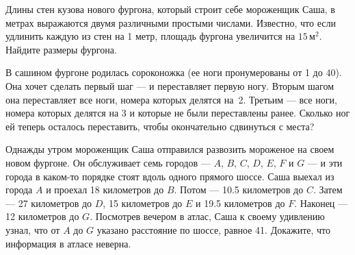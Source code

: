 ﻿
\begin{enumerate}
\itA Длины стен кузова нового фургона, который строит себе мороженщик Саша, в метрах выражаются двумя различными простыми числами. Известно, что если удлинить каждую из стен на 1 метр, площадь фургона увеличится на $15\,\text{м}^2$. Найдите размеры фургона.

\itB В сашином фургоне родилась сороконожка (ее ноги пронумерованы от 1 до 40). Она хочет сделать первый шаг — и переставляет первую ногу. Вторым шагом она переставляет все ноги, номера которых делятся на~2. Третьим — все ноги, номера которых делятся на 3 и которые не были переставлены ранее. Сколько ног ей теперь осталось переставить, чтобы окончательно сдвинуться с места?

\itC Однажды утром мороженщик Саша отправился развозить мороженое на своем новом фургоне. Он обслуживает семь городов — $A$, $B$, $C$, $D$, $E$, $F$ и $G$ — и эти города в каком-то порядке стоят вдоль одного прямого шоссе. Саша выехал из города $A$ и проехал 18 километров до $B$. Потом — 10.5 километров до $C$. Затем — 27 километров до $D$, 15 километров до $E$ и 19.5 километров до $F$. Наконец — 12 километров до $G$. Посмотрев вечером в атлас, Саша к своему удивлению узнал, что от $A$ до $G$ указано расстояние по шоссе, равное \SI{41}{}. Докажите, что информация в атласе неверна.
\end{enumerate}